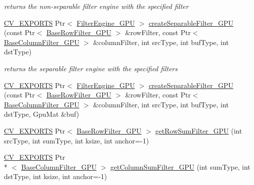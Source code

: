 \begin{DoxyCompactItemize}
\begin{DoxyCompactList}\small\item\em returns the non-\/separable filter engine with the specified filter \end{DoxyCompactList}\item 
\hyperlink{core_2types__c_8h_a1bf9f0e121b54272da02379cfccd0a2b}{C\-V\-\_\-\-E\-X\-P\-O\-R\-T\-S} Ptr$<$ \hyperlink{classcv_1_1gpu_1_1FilterEngine__GPU}{Filter\-Engine\-\_\-\-G\-P\-U} $>$ \hyperlink{namespacecv_1_1gpu_a8fadfdcb3978e4d00e160cda4ad8dd01}{create\-Separable\-Filter\-\_\-\-G\-P\-U} (const Ptr$<$ \hyperlink{classcv_1_1gpu_1_1BaseRowFilter__GPU}{Base\-Row\-Filter\-\_\-\-G\-P\-U} $>$ \&row\-Filter, const Ptr$<$ \hyperlink{classcv_1_1gpu_1_1BaseColumnFilter__GPU}{Base\-Column\-Filter\-\_\-\-G\-P\-U} $>$ \&column\-Filter, int src\-Type, int buf\-Type, int dst\-Type)
\begin{DoxyCompactList}\small\item\em returns the separable filter engine with the specified filters \end{DoxyCompactList}\item 
\hyperlink{core_2types__c_8h_a1bf9f0e121b54272da02379cfccd0a2b}{C\-V\-\_\-\-E\-X\-P\-O\-R\-T\-S} Ptr$<$ \hyperlink{classcv_1_1gpu_1_1FilterEngine__GPU}{Filter\-Engine\-\_\-\-G\-P\-U} $>$ \hyperlink{namespacecv_1_1gpu_a7689dc9057a9d04de0f7f5e3bbf61e70}{create\-Separable\-Filter\-\_\-\-G\-P\-U} (const Ptr$<$ \hyperlink{classcv_1_1gpu_1_1BaseRowFilter__GPU}{Base\-Row\-Filter\-\_\-\-G\-P\-U} $>$ \&row\-Filter, const Ptr$<$ \hyperlink{classcv_1_1gpu_1_1BaseColumnFilter__GPU}{Base\-Column\-Filter\-\_\-\-G\-P\-U} $>$ \&column\-Filter, int src\-Type, int buf\-Type, int dst\-Type, Gpu\-Mat \&buf)
\item 
\hyperlink{core_2types__c_8h_a1bf9f0e121b54272da02379cfccd0a2b}{C\-V\-\_\-\-E\-X\-P\-O\-R\-T\-S} Ptr$<$ \hyperlink{classcv_1_1gpu_1_1BaseRowFilter__GPU}{Base\-Row\-Filter\-\_\-\-G\-P\-U} $>$ \hyperlink{namespacecv_1_1gpu_a08c25ca8ae392ce3c147ba7bde8be68a}{get\-Row\-Sum\-Filter\-\_\-\-G\-P\-U} (int src\-Type, int sum\-Type, int ksize, int anchor=-\/1)
\item 
\hyperlink{core_2types__c_8h_a1bf9f0e121b54272da02379cfccd0a2b}{C\-V\-\_\-\-E\-X\-P\-O\-R\-T\-S} Ptr\\*
$<$ \hyperlink{classcv_1_1gpu_1_1BaseColumnFilter__GPU}{Base\-Column\-Filter\-\_\-\-G\-P\-U} $>$ \hyperlink{namespacecv_1_1gpu_a8df9b23ff4b68ff6657d30ec58babbdb}{get\-Column\-Sum\-Filter\-\_\-\-G\-P\-U} (int sum\-Type, int dst\-Type, int ksize, int anchor=-\/1)

\end{DoxyCompactItemize}
